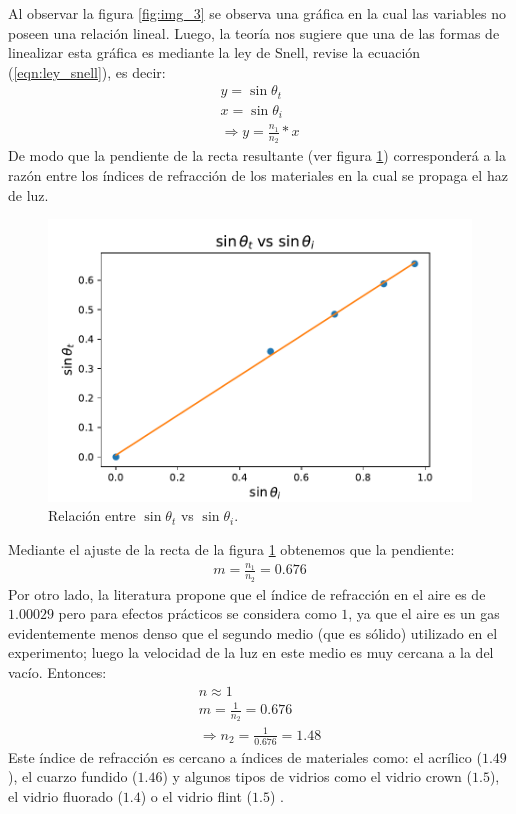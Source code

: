 \documentclass[
aps,
reprint,
amsmath, amssymb,
superscriptaddress,
]{revtex4-2}
\begin{document}
Al observar la figura \ref{fig:img_3} se observa una gráfica en la cual las variables no poseen una relación lineal. Luego, la teoría nos sugiere que una de las formas de linealizar esta gráfica es mediante la ley de Snell, revise la ecuación (\ref{eqn:ley_snell}), es decir:
\begin{gather}
    y = \sin{\theta_t}\\
    x = \sin{\theta_i}\\
    \Rightarrow y = \frac{n_1}{n_2}*x 
\end{gather}
De modo que la pendiente de la recta resultante (ver figura \ref{fig:img_4}) corresponderá a la razón entre los índices de refracción de los materiales en la cual se propaga el haz de luz.
\begin{figure}
\centering
\includegraphics[width=\columnwidth]{img/img3.pdf}
\caption{\label{fig:img_4} Relación entre $\sin{\theta_t}$ vs $\sin{\theta_i}$.}
\end{figure}
Mediante el ajuste de la recta de la figura \ref{fig:img_4} obtenemos que la pendiente:
\begin{gather}
    m = \frac{n_1}{n_2} = 0.676 
\end{gather}
Por otro lado, la literatura propone que el índice de refracción en el aire es de $1.00029$ pero para efectos prácticos se considera como $1$, ya que el aire es un gas evidentemente menos denso que el segundo medio (que es sólido) utilizado en el experimento; luego la velocidad de la luz en este medio es muy cercana a la del vacío. Entonces:
\begin{gather}
    n \approx 1\\
    m = \frac{1}{n_2} = 0.676\\
    \Rightarrow n_2 = \frac{1}{0.676} = 1.48
\end{gather}
Este índice de refracción es cercano a índices de materiales como: el acrílico ($1.49$), el cuarzo fundido ($1.46$) y algunos tipos de vidrios como el vidrio crown ($1.5$), el vidrio fluorado ($1.4$) o el vidrio flint ($1.5$) \cite{eswiki:139589363}.\\
\end{document}
